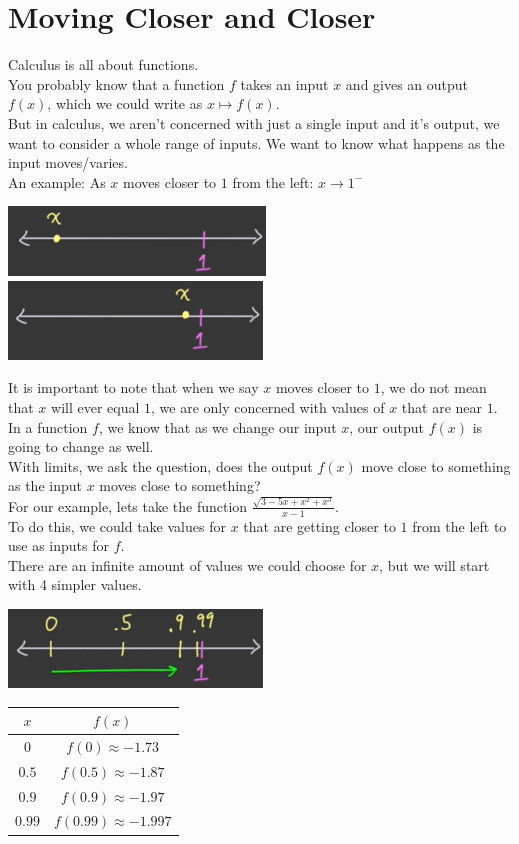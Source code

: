 \documentclass{article}
\begin{document}
\section{Moving Closer and Closer}
Calculus is all about functions.
\\You probably know that a function $f$ takes an input $x$ and gives an output $f(x)$, which we could write as
$x \mapsto f(x)$.
\\But in calculus, we aren't concerned with just a single input and it's output, we want to consider
a whole range of inputs. We want to know what happens as the input moves/varies.
\\An example: As $x$ moves closer to $1$ from the left: $x \rightarrow 1^{-}$
\begin{center}
    \includegraphics[scale = 1]{Images/MovingCloser1.png}
    \\\includegraphics[scale = 1.01]{Images/MovingCloser2.png}        
\end{center}
It is important to note that when we say $x$ moves closer to $1$, we do not mean that $x$ will ever
equal $1$, we are only concerned with values of $x$ that are near $1$.
\\In a function $f$, we know that as we change our input $x$, our output $f(x)$ is going to change as well.
\\With limits, we ask the question, does the output $f(x)$ move close to something as the input $x$
moves close to something?
\\For our example, lets take the function $\frac{\sqrt{3 - 5x + x^{2} + x^{3}}}{x - 1}$.
\\To do this, we could take values for $x$ that are getting closer to $1$ from the left to use as
inputs for $f$.
\\There are an infinite amount of values we could choose for $x$, but we will start with 4 simpler values.
\begin{center}
    \includegraphics[scale = 1]{Images/MovingCloser3.png}\\
    \begin{tabular}{ c|c }
        $x$ & $f(x)$\\
        \hline
        $0$ & $f(0) \approx -1.73$\\
        $0.5$ & $f(0.5) \approx -1.87$\\
        $0.9$ & $f(0.9) \approx -1.97$\\
        $0.99$ & $f(0.99) \approx -1.997$
    \end{tabular}
\end{center}
\end{document}
